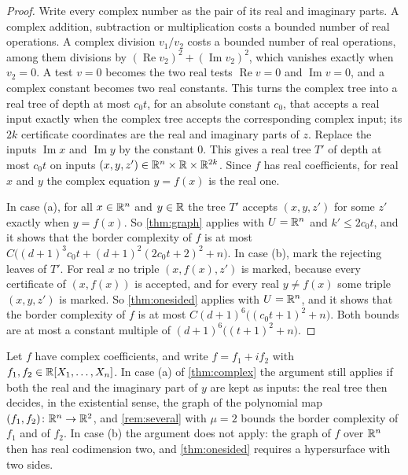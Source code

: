 \begin{proof}
Write every complex number as the pair of its real and imaginary parts. A complex addition, subtraction or multiplication costs a bounded number of real operations. A complex division $v_1/v_2$ costs a bounded number of real operations, among them divisions by $(\operatorname{Re}v_2)^2+(\operatorname{Im}v_2)^2$, which vanishes exactly when $v_2=0$. A test $v=0$ becomes the two real tests $\operatorname{Re}v=0$ and $\operatorname{Im}v=0$, and a complex constant becomes two real constants. This turns the complex tree into a real tree of depth at most $c_0t$, for an absolute constant $c_0$, that accepts a real input exactly when the complex tree accepts the corresponding complex input; its $2k$ certificate coordinates are the real and imaginary parts of $z$. Replace the inputs $\operatorname{Im}x$ and $\operatorname{Im}y$ by the constant $0$. This gives a real tree $T'$ of depth at most $c_0t$ on inputs $(x,y,z')\in\mathbb{R}^n\times\mathbb{R}\times\mathbb{R}^{2k}$. Since $f$ has real coefficients, for real $x$ and $y$ the complex equation $y=f(x)$ is the real one.

In case (a), for all $x\in\mathbb{R}^n$ and $y\in\mathbb{R}$ the tree $T'$ accepts $(x,y,z')$ for some $z'$ exactly when $y=f(x)$. So \cref{thm:graph} applies with $U=\mathbb{R}^n$ and $k'\le2c_0t$, and it shows that the border complexity of $f$ is at most $C\bigl((d+1)^3c_0t+(d+1)^2(2c_0t+2)^2+n\bigr)$. In case (b), mark the rejecting leaves of $T'$. For real $x$ no triple $(x,f(x),z')$ is marked, because every certificate of $(x,f(x))$ is accepted, and for every real $y\ne f(x)$ some triple $(x,y,z')$ is marked. So \cref{thm:onesided} applies with $U=\mathbb{R}^n$, and it shows that the border complexity of $f$ is at most $C(d+1)^6\bigl((c_0t+1)^2+n\bigr)$. Both bounds are at most a constant multiple of $(d+1)^6\bigl((t+1)^2+n\bigr)$.
\end{proof}

\begin{remark}\label{rem:complexcoef}
Let $f$ have complex coefficients, and write $f=f_1+if_2$ with $f_1,f_2\in\mathbb{R}[X_1,\dots,X_n]$. In case (a) of \cref{thm:complex} the argument still applies if both the real and the imaginary part of $y$ are kept as inputs: the real tree then decides, in the existential sense, the graph of the polynomial map $(f_1,f_2)\colon\mathbb{R}^n\to\mathbb{R}^2$, and \cref{rem:several} with $\mu=2$ bounds the border complexity of $f_1$ and of $f_2$. In case (b) the argument does not apply: the graph of $f$ over $\mathbb{R}^n$ then has real codimension two, and \cref{thm:onesided} requires a hypersurface with two sides.
\end{remark}

